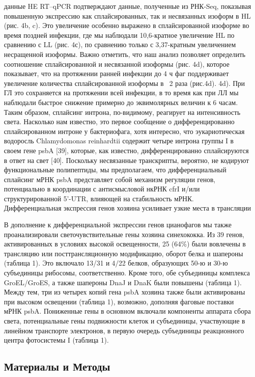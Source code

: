 \documentclass[a4paper,12pt]{article}
\begin{document}
            \par{данные HE RT–qPCR подтверждают данные, полученные из РНК-Seq, показывая повышенную экспрессию как
            сплайсированных, так и несвязанных изоформ в HL (рис. 4b, c). Это увеличение особенно выражено в
            сплайсированной изоформе во время поздней инфекции, где мы наблюдали 10,6-кратное увеличение HL по
            сравнению с LL (рис. 4с), по сравнению только с 3,37-кратным увеличением несращенной изоформы. Важно
            отметить, что наш анализ позволяет определить соотношение сплайсированной и несвязанной изоформы (рис. 4d),
            которое показывает, что на протяжении ранней инфекции до 4 ч фаг поддерживает увеличение количества
            сплайсированной изоформы в ~2 раза (рис.4d). 4d). При ГЛ это сохраняется на протяжении всей инфекции, в то
            время как при ЛЛ мы наблюдали быстрое снижение примерно до эквимолярных величин к 6 часам. Таким образом,
            сплайсинг интрона, по-видимому, реагирует на интенсивность света. Насколько нам известно, это первое
            сообщение о дифференцированно сплайсированном интроне у бактериофага, хотя интересно, что эукариотическая
            водоросль Chlamydomonas reinhardtii содержит четыре интрона группы I в своем гене psbA [39], которые, как
            известно, дифференцированно сплайсируются в ответ на свет [40]. Поскольку несвязанные транскрипты,
            вероятно, не кодируют функциональные полипептиды, мы предполагаем, что дифференциальный сплайсинг мРНК psbA
            представляет собой механизм регуляции генов, потенциально в координации с антисмысловой нкРНК cfrI и/или
            структурированной 5'-UTR, влияющей на стабильность мРНК.}\\
            {\Large Дифференциальная экспрессия генов хозяина усиливает узкие места в трансляции}
            \par{В дополнение к дифференциальной экспрессии генов цианофагов мы также проанализировали
            светочувствительные гены хозяина синехококка. Из 39 генов, активированных в условиях высокой освещенности,
            25 (64\%) были вовлечены в трансляцию или посттрансляционную модификацию, оборот белка и шапероны (таблица
            1). Это включало 13/31 и 4/22 белков, образующих 50-ю и 30-ю субъединицы рибосомы, соответственно. Кроме
            того, обе субъединицы комплекса GroEL/GroES, а также шапероны DnaJ и DnaK были повышены (таблица 1). Между
            тем, три из четырех копий гена psbA хозяина также были активированы при высоком освещении (таблица 1),
            возможно, дополняя фаговые поставки мРНК psbA. Пониженные гены в основном включали компоненты аппарата
            сбора света, потенциальные гены подвижности клеток и субъединицы, участвующие в линейном транспорте
            электронов, в первую очередь субъединицы реакционного центра фотосистемы I (таблица 1).}
\newpage
\begin{center}
\section{Материалы и Методы} \label{sec:code}
\end{center}
\end{document}
